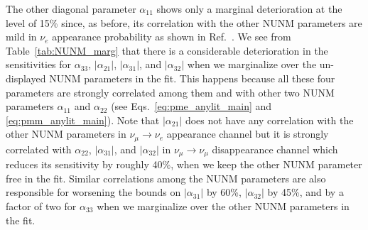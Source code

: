 \documentclass[11pt,a4paper]{article}
\begin{document}
\begin{appendix}
The other diagonal parameter $\alpha_{11}$ shows only a marginal deterioration at the level of 15\% since, as before, its correlation with the other NUNM parameters are mild in $\nu_e$ appearance probability as shown in Ref.~\cite{Escrihuela:2015wra}.
We see from Table~\ref{tab:NUNM_marg} that there is a considerable deterioration in the sensitivities for $\alpha_{33}$, $|\alpha_{21}|$, $|\alpha_{31}|$, and $|\alpha_{32}|$ when we marginalize over the un-displayed NUNM parameters in the fit.  
This happens because all these four parameters are strongly correlated among them and with other two NUNM parameters $\alpha_{11}$ and $\alpha_{22}$ (see Eqs.~\ref{eq:pme_anylit_main} and \ref{eq:pmm_anylit_main}).
Note that $|\alpha_{21}|$ does not have any correlation with the other NUNM parameters in $\nu_\mu\rightarrow\nu_e$ appearance channel but it is strongly correlated with $\alpha_{22}$, $|\alpha_{31}|$, and $|\alpha_{32}|$ in $\nu_\mu\rightarrow\nu_\mu$ disappearance channel which reduces its sensitivity by roughly 40\%, when we keep the other NUNM parameter free in the fit.
Similar correlations among the NUNM parameters are also responsible for worsening the bounds on $|\alpha_{31}|$ by 60\%, $|\alpha_{32}|$ by 45\%, and by a factor of two for $\alpha_{33}$ when we marginalize over the other NUNM parameters in the fit.

\end{appendix}
\newpage


\end{document}
